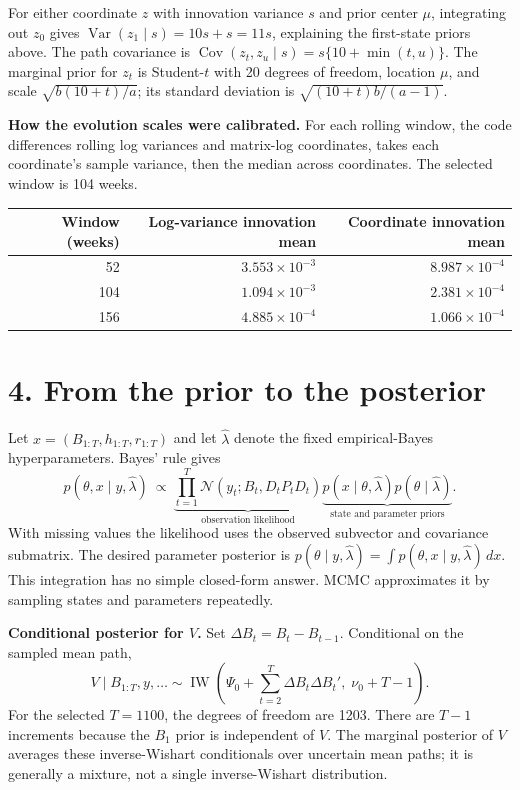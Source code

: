 \documentclass[10pt,a4paper]{article}
\newcommand{\Normal}{\mathcal N}
\newcommand{\IW}{\operatorname{IW}}
\begin{document}
For either coordinate $z$ with innovation variance $s$ and prior center $\mu$, integrating
out $z_0$ gives $\operatorname{Var}(z_1\mid s)=10s+s=11s$, explaining the first-state priors above.
The path covariance is $\operatorname{Cov}(z_t,z_u\mid s)=s\{10+\min(t,u)\}$.
The marginal prior for $z_t$ is Student-$t$ with 20 degrees of freedom, location $\mu$,
and scale $\sqrt{b(10+t)/a}$; its standard deviation is $\sqrt{(10+t)b/(a-1)}$.

\textbf{How the evolution scales were calibrated.} For each rolling window, the code
differences rolling log variances and matrix-log coordinates, takes each coordinate's
sample variance, then the median across coordinates. The selected window is 104 weeks.
\begin{center}\small
\begin{tabular}{rrr}\toprule
Window (weeks) & Log-variance innovation mean & Coordinate innovation mean\\\midrule
52 & $3.553\times10^{-3}$ & $8.987\times10^{-4}$ \\
104 & $1.094\times10^{-3}$ & $2.381\times10^{-4}$ \\
156 & $4.885\times10^{-4}$ & $1.066\times10^{-4}$ \\
\bottomrule\end{tabular}\end{center}

\clearpage
\section*{4. From the prior to the posterior}
Let $x=(B_{1:T},h_{1:T},r_{1:T})$ and let $\hat\lambda$ denote the fixed empirical-Bayes
hyperparameters. Bayes' rule gives
\[
p(\theta,x\mid y,\hat\lambda)\ \propto\
\underbrace{\prod_{t=1}^T\Normal(y_t;B_t,D_tP_tD_t)}_{\text{observation likelihood}}
\underbrace{p(x\mid\theta,\hat\lambda)p(\theta\mid\hat\lambda)}_{\text{state and parameter priors}}.
\]
With missing values the likelihood uses the observed subvector and covariance submatrix.
The desired parameter posterior is $p(\theta\mid y,\hat\lambda)=
\int p(\theta,x\mid y,\hat\lambda)\,dx$. This integration has no simple closed-form answer.
MCMC approximates it by sampling states and parameters repeatedly.

\textbf{Conditional posterior for $V$.} Set $\Delta B_t=B_t-B_{t-1}$. Conditional on
the sampled mean path,
\[
\boxed{V\mid B_{1:T},y,\ldots\sim
\IW\left(\Psi_0+\sum_{t=2}^T\Delta B_t\Delta B_t',\;\nu_0+T-1\right).}
\]
For the selected $T=1100$, the degrees of freedom are 1203.
There are $T-1$ increments because the $B_1$ prior is independent of $V$.
The marginal posterior of $V$ averages these inverse-Wishart conditionals over uncertain
mean paths; it is generally a mixture, not a single inverse-Wishart distribution.
\end{document}
